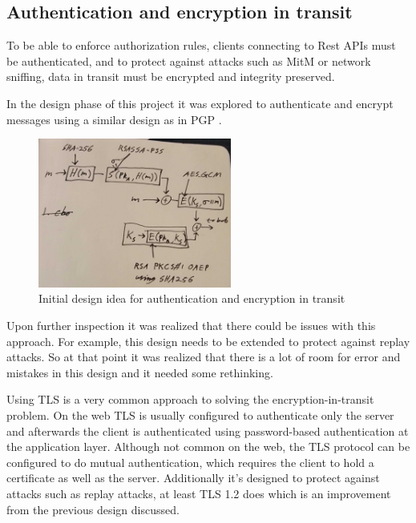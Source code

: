 \documentclass[11pt]{article}
\begin{document}
\begin{flushleft}
\subsection{Authentication and encryption in transit}

To be able to enforce authorization rules, clients connecting to Rest APIs must be authenticated, and to protect against attacks such as MitM or network sniffing, data in transit must be encrypted and integrity preserved.

In the design phase of this project it was explored to authenticate and encrypt messages using a similar design as in PGP \cite{pgpdesign}.

\begin{figure}[h!]
	\begin{center}
		\includegraphics[width = 240px]{images/inspired_by_pgp_cropped.jpg}
		\caption{Initial design idea for authentication and encryption in transit}
		\label{fig:inspired_by_pgp}
	\end{center}
\end{figure}

Upon further inspection it was realized that there could be issues with this approach. For example, this design needs to be extended to protect against replay attacks. So at that point it was realized that there is a lot of room for error and mistakes in this design and it needed some rethinking.

Using TLS is a very common approach to solving the encryption-in-transit problem. On the web TLS is usually configured to authenticate only the server and afterwards the client is authenticated using password-based authentication at the application layer. Although not common on the web, the TLS protocol can be configured to do mutual authentication, which requires the client to hold a certificate as well as the server. Additionally it's designed to protect against attacks such as replay attacks, at least TLS 1.2 does \cite{tls_12_anti_replay} which is an improvement from the previous design discussed.


\end{flushleft}
\end{document}
